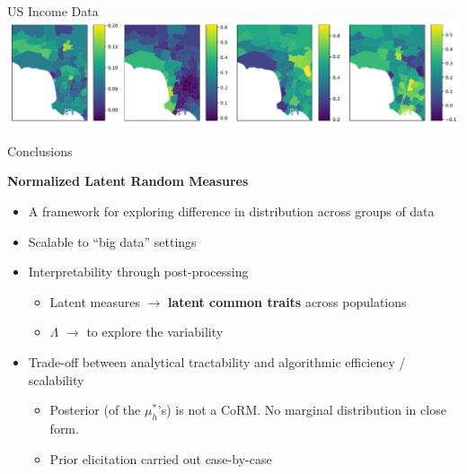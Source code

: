 \documentclass[10.5pt, aspectratio=169]{beamer} %
\begin{document}
\begin{frame}{US Income Data}
{\hspace{1cm} \includegraphics[width=0.9\linewidth]{income_lam_la}
}

\end{frame}


\begin{frame}{Conclusions}

\textbf{Normalized Latent Random Measures}

\medskip

\begin{itemize}[<+->]
	\setlength{\itemsep}{1.2em}
	
	\item A framework for exploring difference in distribution across groups of data
	
	\item Scalable to ``big data'' settings
	
	\item Interpretability through post-processing
	\begin{itemize}
		\item Latent measures $\longrightarrow$ \textbf{latent common traits} across populations
		\item $\Lambda$ $\longrightarrow$  to explore the variability
	\end{itemize}
	
	\item Trade-off between analytical tractability and algorithmic efficiency / scalability
	\begin{itemize}
		\item Posterior (of the $\mu^*_h$'s) is not a CoRM. No marginal distribution in close form.
		\item Prior elicitation carried out case-by-case
	\end{itemize}
	
\end{itemize}

\end{frame}
\end{document}
